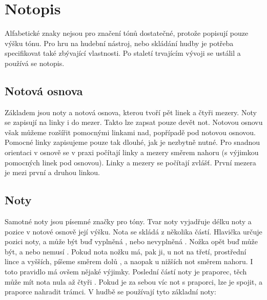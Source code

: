 \section{Notopis}
Alfabetické znaky nejsou pro značení tónů dostatečné, protože popisují pouze výšku tónu.
Pro hru na hudební nástroj, nebo skládání hudby je potřeba specifikovat také zbývající vlastnosti.
Po staletí trvajícím vývoji se ustálil a používá se notopis.\par

\subsection*{Notová osnova}
Základem jsou noty a notová osnova, kterou tvoří pět linek a čtyři mezery.
Noty se zapisují na linky i do mezer.
Takto lze zapsat pouze devět not.
Notovou osnovu však můžeme rozšířit pomocnými linkami nad, popřípadě pod notovou osnovou. 
Pomocné linky zapisujeme pouze tak dlouhé, jak je nezbytně nutné.
Pro snadnou orientaci v osnově se v praxi počítají linky a mezery směrem nahoru (s výjimkou pomocných linek pod osnovou). 
Linky a mezery se počítají zvlášť. 
První mezera je mezi první a druhou linkou.\par


\subsection*{Noty}
Samotné noty jsou písemné značky pro tóny.
Tvar noty vyjadřuje délku noty a pozice v notové osnově její výšku.
Nota se skládá z několika částí.
Hlavička určuje pozici noty, a může být buď vyplněná , nebo nevyplněná . 
Nožka opět buď může být, a nebo nemusí . 
Pokud nota nožku má, pak ji, u not na třetí, prostřední lince a vyšších, píšeme směrem dolů ,
a naopak u nižších not směrem nahoru.
I toto pravidlo má ovšem nějaké výjimky.
Poslední částí noty je praporec, těch může mít nota nula až čtyři .
Pokud je za sebou víc not s praporci, lze je spojit, a praporce nahradit trámci.
V hudbě se používají tyto základní noty:



